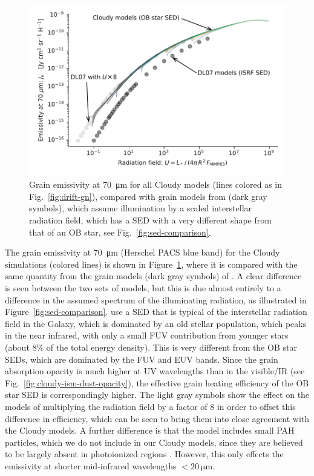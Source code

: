 \begin{figure}
  \centering
  \includegraphics[width=\linewidth]{figs/grain-j70-vs-U-edited}
  \caption{Grain emissivity at \SI{70}{\um} for all Cloudy models
    (lines colored as in Fig.~\ref{fig:drift-gn}), compared with grain
    models from \citet{Draine:2007a} (dark gray symbols), which assume
    illumination by a scaled interstellar radiation field, which has a
    SED with a very different shape from that of an OB star, see
    Fig.~\ref{fig:sed-comparison}.  }
  \label{fig:grain-j70}
\end{figure}

The grain emissivity at \SI{70}{\um} (Herschel PACS blue band) for the
Cloudy simulations (colored lines) is shown in
Figure~\ref{fig:grain-j70}, where it is compared with the same
quantity from the grain models (dark gray symbols) of
\citet{Draine:2007a}.  A clear difference is seen between the two sets
of models, but this is due almost entirely to a difference in the
assumed spectrum of the illuminating radiation, as illustrated in
Figure~\ref{fig:sed-comparison}.  \citet{Draine:2007a} use a SED that
is typical of the interstellar radiation field in the Galaxy, which is
dominated by an old stellar population, which peaks in the near
infrared, with only a small FUV contribution from younger stars (about
8\% of the total energy density).  This is very different from the OB
star SEDs, which are dominated by the FUV and EUV bands.  Since the
grain absorption opacity is much higher at UV wavelengths than in the
visible/IR (see Fig.~\ref{fig:cloudy-ism-dust-opacity}), the effective
grain heating efficiency of the OB star SED is correspondingly higher.
The light gray symbols show the effect on the \citet{Draine:2007a}
models of multiplying the radiation field by a factor of \num{8} in
order to offset this difference in efficiency, which can be seen to
bring them into close agreement with the Cloudy models.  A further
difference is that the \citet{Draine:2007a} model includes small PAH
particles, which we do not include in our Cloudy models, since they
are believed to be largely absent in photoionized regions
\citep{Giard:1994a, Lebouteiller:2011a}.  However, this only effects
the emissivity at shorter mid-infrared wavelengths \(< \SI{20}{\um}\).

